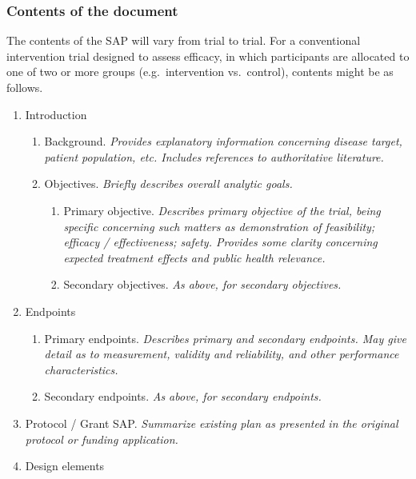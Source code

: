 \documentclass[]{book}
\providecommand{\tightlist}{%
  \setlength{\itemsep}{0pt}\setlength{\parskip}{0pt}}
\begin{document}
\subsubsection{Contents of the document}\label{contents-of-the-document}

The contents of the SAP will vary from trial to trial. For a
conventional intervention trial designed to assess efficacy, in which
participants are allocated to one of two or more groups
(e.g.~intervention vs.~control), contents might be as follows.

\begin{enumerate}
\def\labelenumi{\arabic{enumi}.}
\tightlist
\item
  Introduction

  \begin{enumerate}
  \def\labelenumii{\alph{enumii}.}
  \tightlist
  \item
    Background. \emph{Provides explanatory information concerning
    disease target, patient population, etc. Includes references to
    authoritative literature.}
  \item
    Objectives. \emph{Briefly describes overall analytic goals.}

    \begin{enumerate}
    \def\labelenumiii{\roman{enumiii}.}
    \tightlist
    \item
      Primary objective. \emph{Describes primary objective of the trial,
      being specific concerning such matters as demonstration of
      feasibility; efficacy / effectiveness; safety. Provides some
      clarity concerning expected treatment effects and public health
      relevance.}
    \item
      Secondary objectives. \emph{As above, for secondary objectives.}
    \end{enumerate}
  \end{enumerate}
\item
  Endpoints

  \begin{enumerate}
  \def\labelenumii{\alph{enumii}.}
  \tightlist
  \item
    Primary endpoints. \emph{Describes primary and secondary endpoints.
    May give detail as to measurement, validity and reliability, and
    other performance characteristics.}
  \item
    Secondary endpoints. \emph{As above, for secondary endpoints.}
  \end{enumerate}
\item
  Protocol / Grant SAP. \emph{Summarize existing plan as presented in
  the original protocol or funding application.}\\
\item
  Design elements


\end{enumerate}
\end{document}
